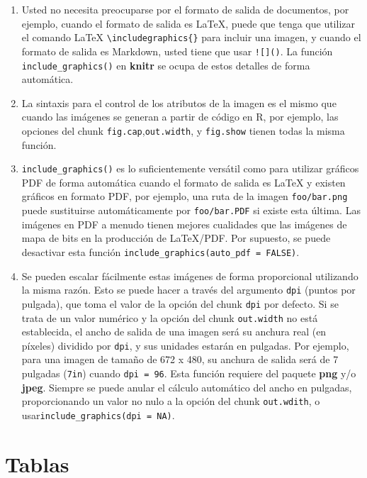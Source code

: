\documentclass[12pt,]{krantz}
\providecommand{\tightlist}{%
  \setlength{\itemsep}{0pt}\setlength{\parskip}{0pt}}
\theoremstyle{definition}
\theoremstyle{definition}
\theoremstyle{definition}
\theoremstyle{remark}
\begin{document}
\begin{enumerate}
\def\labelenumi{\arabic{enumi}.}
\tightlist
\item
  Usted no necesita preocuparse por el formato de salida de documentos,
  por ejemplo, cuando el formato de salida es LaTeX, puede que tenga que
  utilizar el comando LaTeX \texttt{\textbackslash{}includegraphics\{\}}
  para incluir una imagen, y cuando el formato de salida es Markdown,
  usted tiene que usar \texttt{!{[}{]}()}. La función
  \texttt{include\_graphics()} en \textbf{knitr} se ocupa de estos
  detalles de forma automática.
\item
  La sintaxis para el control de los atributos de la imagen es el mismo
  que cuando las imágenes se generan a partir de código en R, por
  ejemplo, las opciones del chunk \texttt{fig.cap},\texttt{out.width}, y
  \texttt{fig.show} tienen todas la misma función.
\item
  \texttt{include\_graphics()} es lo suficientemente versátil como para
  utilizar gráficos PDF de forma automática cuando el formato de salida
  es LaTeX y existen gráficos en formato PDF, por ejemplo, una ruta de
  la imagen \texttt{foo/bar.png} puede sustituirse automáticamente por
  \texttt{foo/bar.PDF} si existe esta última. Las imágenes en PDF a
  menudo tienen mejores cualidades que las imágenes de mapa de bits en
  la producción de LaTeX/PDF. Por supuesto, se puede desactivar esta
  función \texttt{include\_graphics(auto\_pdf\ =\ FALSE)}.
\item
  Se pueden escalar fácilmente estas imágenes de forma proporcional
  utilizando la misma razón. Esto se puede hacer a través del argumento
  \texttt{dpi} (puntos por pulgada), que toma el valor de la opción del
  chunk \texttt{dpi} por defecto. Si se trata de un valor numérico y la
  opción del chunk \texttt{out.width} no está establecida, el ancho de
  salida de una imagen será su anchura real (en píxeles) dividido por
  \texttt{dpi}, y sus unidades estarán en pulgadas. Por ejemplo, para
  una imagen de tamaño de 672 x 480, su anchura de salida será de 7
  pulgadas (\texttt{7in}) cuando \texttt{dpi\ =\ 96}. Esta función
  requiere del paquete \textbf{png} y/o \textbf{jpeg}. Siempre se puede
  anular el cálculo automático del ancho en pulgadas, proporcionando un
  valor no nulo a la opción del chunk \texttt{out.wdith}, o
  usar\texttt{include\_graphics(dpi\ =\ NA)}.
\end{enumerate}

\hypertarget{tablas}{\section{Tablas}\label{tablas}}
\end{document}
